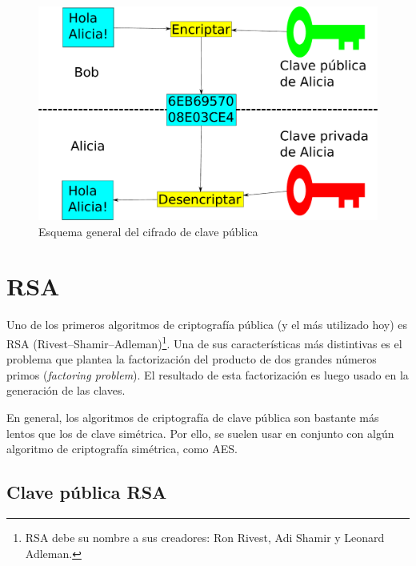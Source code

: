 \begin{figure}[ht]
  \centering
  \includegraphics[scale=0.3]{Figures/PublicKeyEncryption}
  \decoRule
  \caption[Cifrado de clave pública (Esquema)]{Esquema general del cifrado de clave pública}
  \label{fig:PublicKeyEncryption}
\end{figure}


\section{RSA}

\label{RSA}

Uno de los primeros algoritmos de criptografía pública (y el más utilizado hoy) es RSA (Rivest–Shamir–Adleman)\footnote{RSA debe su nombre a sus creadores: Ron Rivest, Adi Shamir y Leonard Adleman.}. Una de sus características más distintivas es el problema que plantea la factorización del producto de dos grandes números primos (\emph{factoring problem}). El resultado de esta factorización es luego usado en la generación de las claves.

En general, los algoritmos de criptografía de clave pública son bastante más lentos que los de clave simétrica. Por ello, se suelen usar en conjunto con algún algoritmo de criptografía simétrica, como AES. \emph{\parencite{Reference9}}

\subsection{Clave pública RSA}

